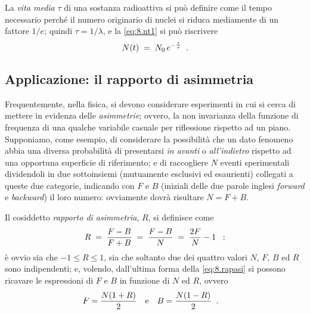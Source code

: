 La \emph{vita media}%
$\tau$ di una sostanza radioattiva si pu\`o definire come il
tempo necessario perch\'e il numero originario di nuclei si
riduca mediamente di un fattore $1/e$; quindi $ \tau = 1 /
\lambda $, e la \eqref{eq:8.nt1} si pu\`o riscrivere
\begin{equation} \label{eq:8.nt2}
  N(t) \; = \; N_0 \, e^{- \frac{t}{\tau}} \;\; .
\end{equation}

\subsection{Applicazione: il rapporto di asimmetria}%
%
%
\label{ch:8.rasim1}
Frequentemente, nella fisica, si devono considerare
esperimenti in cui si cerca di mettere in evidenza delle
\emph{asimmetrie}; ovvero, la non invarianza della funzione
di frequenza di una qualche variabile casuale per
riflessione rispetto ad un piano.  Supponiamo, come esempio,
di considerare la possibilit\`a che un dato fenomeno abbia
una diversa probabilit\`a di presentarsi \emph{in avanti} o
\emph{all'indietro} rispetto ad una opportuna superficie di
riferimento; e di raccogliere $N$ eventi sperimentali
dividendoli in due sottoinsiemi (mutuamente esclusivi ed
esaurienti) collegati a queste due categorie, indicando con
$F$ e $B$ (iniziali delle due parole inglesi \emph{forward}
e \emph{backward}) il loro numero: ovviamente dovr\`a
risultare $N = F + B$.

Il cosiddetto \emph{rapporto di asimmetria}, $R$, si
definisce come
\begin{equation} \label{eq:8.rapasi}
  R \; = \; \frac{F - B}{F + B} \; = \; \frac{F - B}{N} \; =
  \; \frac{2F}{N} - 1 \;\; :
\end{equation}
\`e ovvio sia che $-1 \leq R \leq 1$, sia che soltanto due
dei quattro valori $N$, $F$, $B$ ed $R$ sono indipendenti;
e, volendo, dall'ultima forma della \eqref{eq:8.rapasi} si
possono ricavare le espressioni di $F$ e $B$ in funzione di
$N$ ed $R$, ovvero
\begin{align*}
  F &= \frac{N (1 + R)}{2} &&\text{e} & B &= \frac{N (1 -
    R)}{2} \;\; .
\end{align*}


